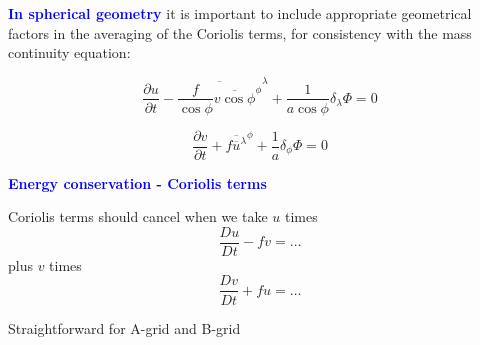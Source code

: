 \documentclass[a4]{seminar}
\newcommand{\B}[1]{\textcolor{blue}{#1}}
\begin{document}
\begin{slide}

\B{\bf In spherical geometry} it is important to include appropriate
geometrical factors in the averaging of the Coriolis terms, for consistency
with the mass continuity equation:

\begin{displaymath}
\frac{\partial u}{\partial t}
-
\overline{\frac{f}{\cos \phi} \overline{v \cos \phi}^\phi}^\lambda
+
\frac{1}{a \cos \phi} \delta_\lambda \Phi
=0
\end{displaymath}

\begin{displaymath}
\frac{\partial v}{\partial t}
+
\overline{f \overline{u}^\lambda}^\phi
+
\frac{1}{a } \delta_\phi \Phi
=0
\end{displaymath}




\end{slide}


\begin{slide}
\begin{center}
\end{center}

\end{slide}


\begin{slide}

\B{\bf Energy conservation - Coriolis terms}

\vspace{2mm}

Coriolis terms should cancel when we take \( u \) times
\begin{displaymath}
\frac{D u}{D t} - f v = \ldots
\end{displaymath}
plus \( v \) times
\begin{displaymath}
\frac{D v}{D t} + f u = \ldots
\end{displaymath}

\vspace{2mm}

Straightforward for A-grid and B-grid






\end{slide}
\end{document}
